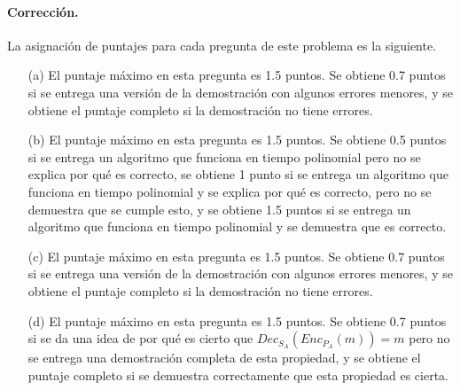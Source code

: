 \paragraph{Corrección.} La asignación de puntajes para cada pregunta de este problema es la siguiente.
\begin{itemize}
\item[(a)] El puntaje máximo en esta pregunta es 1.5 puntos. Se obtiene 0.7 puntos si se entrega una versión de la demostración con algunos errores menores, y se obtiene el puntaje completo si la demostración no tiene errores.

\item[(b)] El puntaje máximo en esta pregunta es 1.5 puntos. Se obtiene 0.5
puntos si se entrega un algoritmo que funciona en tiempo polinomial
pero no se explica por qué es correcto, se obtiene 1 punto si se
entrega un algoritmo que funciona en tiempo polinomial y se explica
por qué es correcto, pero no se demuestra que se cumple esto, y se
obtiene 1.5 puntos si se entrega un algoritmo que funciona en tiempo
polinomial y se demuestra que es correcto.


\item[(c)] El puntaje máximo en esta pregunta es 1.5 puntos. Se obtiene 0.7 puntos si se entrega una versión de la demostración con algunos errores menores, y se obtiene el puntaje completo si la demostración no tiene errores.

\item[(d)] El puntaje máximo en esta pregunta es 1.5 puntos. Se obtiene 0.7 puntos si se da una idea de por qué es cierto que $\textit{Dec}_{S_A}(\textit{Enc}_{P_A}(m)) = m$ pero no se entrega una demostración completa de esta propiedad, y se obtiene el puntaje completo si se demuestra correctamente que esta propiedad es cierta.

\end{itemize}

